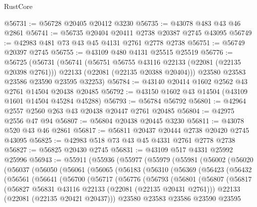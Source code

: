 \begin{lexlean}{RustCore}
\begin{coremodule}
@56731 := @56728 @20405 @20412 @3230
@56735 := @43078 @483 @43 @46 @2861
@56741 := @56735 @20404 @20411 @2738 @20387 @2745 @43095
@56749 := @42983 @481 @73 @43 @45 @4131 @2761 @2778 @2738
@56751 := @56749 @20397 @2745
@56755 := @43109 @480 @4131 @25515 @25519
@56776 := @56725
    (@56731
      (@56741
        (@56751 @56755 @43116 @22133 (@22081 (@22135 @20398 @2761)))
        @22133
        (@22081 (@22135 @20388 @20404)))
      @23580
      @23583
      @23586
      @23590
      @23595
      @32253)
@56784 := @43140 @20414 @1602 @2562 @43 @2761 @14504 @20438 @20485
@56792 := @43150 @1602 @43 @14504 (@43109 @1601 @14504 @45284 @45288)
@56793 := @56784 @56792
@56801 := @42964 @2557 @2560 @263 @43 @20438 @20447 @2761 @20485
@56804 := @42975 @2556 @47 @94
@56807 := @56804 @20438 @20445 @3230
@56811 := @43078 @520 @43 @46 @2861
@56817 := @56811 @20437 @20444 @2738 @20420 @2745 @43095
@56825 := @42983 @518 @73 @43 @45 @4331 @2761 @2778 @2738
@56827 := @56825 @20430 @2745
@56831 := @43109 @517 @4331 @25992 @25996
@56943 := @55911
    (@55936
      (@55977
        (@55979
          (@55981
            (@56002
              (@56020
                (@56037
                  (@56050
                    (@56061
                      (@56065
                        (@56183
                          (@56310
                            (@56369
                              (@56423
                                (@56432
                                  (@56561
                                    (@56641
                                      (@56700
                                        (@56717
                                          (@56776
                                            (@56793
                                              (@56801
                                                (@56807
                                                  (@56817
                                                    (@56827
                                                      @56831
                                                      @43116
                                                      @22133
                                                      (@22081 (@22135 @20431 @2761)))
                                                    @22133
                                                    (@22081 (@22135 @20421 @20437)))
                                                  @23580
                                                  @23583
                                                  @23586
                                                  @23590
                                                  @23595

\end{coremodule}
\end{lexlean}
